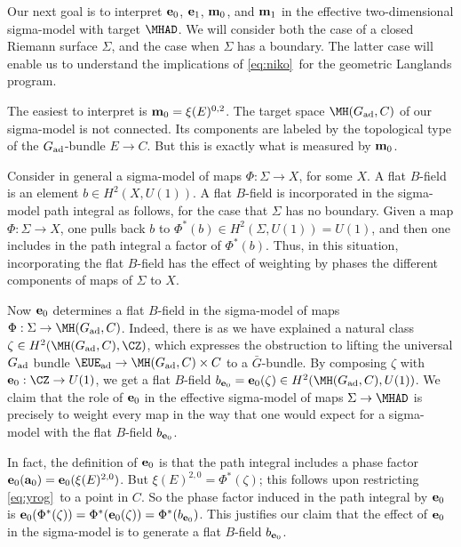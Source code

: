 Our next goal is to interpret ${\bf e}_0$, ${\bf e}_1$, ${\bf
m}_0$, and ${\bf m}_1$ in the effective two-dimensional
sigma-model with target $\MHAD$.  We will consider both the case
of a closed Riemann surface $\Sigma$, and the case when $\Sigma$
has a boundary. The latter case will enable us to understand the
implications of \eqref{eq:niko}\ for the geometric Langlands program.

\par{}

The easiest to interpret is ${\bf m}_0=\xi(E)^{0,2}$.  The target
space $\MH(G_{\rm ad},C)$ of our sigma-model is not connected. Its
components are labeled by the topological type of the $G_{\rm
{ad}}$-bundle $E\to C$.  But this is exactly what is measured by
${\bf m}_0$.

\par{}

Consider in general a sigma-model of maps $\Phi:\Sigma\to X$, for
some $X$.  A flat $B$-field is an element  $b\in H^2(X,U(1))$. A
flat $B$-field is incorporated in the sigma-model path integral as
follows, for the case that $\Sigma$ has no boundary.  Given a map
$\Phi:\Sigma\to X$, one pulls back $b$ to $\Phi^*(b)\in
H^2(\Sigma,U(1))=U(1)$, and then one includes in the path integral
a factor of $\Phi^*(b)$.  Thus, in this situation, incorporating
the flat $B$-field has the effect of weighting by phases the
different components of maps of $\Sigma$ to $X$.

Now ${\bf e}_0$ determines a flat $B$-field in the sigma-model of
maps $\Phi:\Sigma\to \MH(G_{\rm ad},C)$. Indeed, there is as we
have explained a natural class $\zeta\in H^2(\MH(G_{\rm
ad},C),\CZ)$, which expresses the  obstruction to lifting the
universal $G_{\rm{ad}}$ bundle  ${\EUE}_{\rm {ad}}\to\MH(G_{\rm
ad},C)\times C$ to a $\bar G$-bundle.  By composing $\zeta$ with ${\bf
e}_0:\CZ\to U(1)$, we get a flat $B$-field $b_{{\bf e}_0}={\bf
e}_0(\zeta)\in H^2(\MH(G_{\rm{ad}},C),U(1))$.  We claim that the
role of ${\bf e}_0$ in the effective sigma-model of maps
$\Sigma\to \MHAD$ is precisely to weight every map in the way that
one would expect for a sigma-model with the flat $B$-field
$b_{{\bf e}_0}$.

In fact, the definition of ${\bf e}_0$ is that the path integral
includes a phase factor ${\bf e}_0({\bf a}_0)={\bf
e}_0(\xi(E)^{2,0})$.   But $\xi(E)^{2,0}=\Phi^*(\zeta)$; this
follows upon restricting \eqref{eq:yrog}\ to a point in $C$.
So the phase factor induced in the path integral by
${\bf e}_0$ is ${\bf e}_0(\Phi^*(\zeta))=\Phi^*({\bf
e}_0(\zeta))=\Phi^*(b_{{\bf e}_0})$.  This justifies  our claim
that the effect of ${\bf e}_0$ in the sigma-model is to generate a
flat $B$-field $b_{{\bf e}_0}$.

